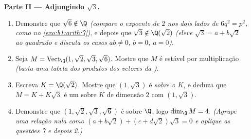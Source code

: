 \begin{problem}
\medskip
\noindent\textbf{Parte II --- Adjungindo $\sqrt3$.}
\begin{enumerate}[resume]
  \item Demonstre que $\sqrt6 \notin \Q$ \emph{(compare o expoente de $2$ nos
        dois lados de $6q^2 = p^2$, como no \cref{exo:b1:arith:7})}, e depois que $\sqrt3 \notin
        \Q(\sqrt2)$
        \emph{(eleve $\sqrt3 = a + b\sqrt2$ ao quadrado e discuta os casos $ab \neq 0$,
        $b = 0$, $a = 0$)}.
  \item Seja $M = \operatorname{Vect}_\Q(1, \sqrt2, \sqrt3,
        \sqrt6)$. Mostre que $M$ é estável por multiplicação
        \emph{(basta uma tabela dos produtos dos vetores da )}.
  \item Escreva $K = \Q(\sqrt2)$. Mostre que $(1, \sqrt3)$ é  \emph{sobre o 
        $K$}, e deduza que $M = K +
        K\sqrt3$ é um  sobre $K$ de
        dimensão $2$ com  $(1, \sqrt3)$.
  \item Demonstre que $(1, \sqrt2, \sqrt3, \sqrt6)$ é  sobre $\Q$, logo $\dim_\Q M = 4$.
        \emph{(Agrupe uma relação nula como $(a + b\sqrt2) + (c + d\sqrt2)\sqrt3 = 0$ e aplique as
        questões 7 e depois 2.)}
\end{enumerate}


\end{problem}
